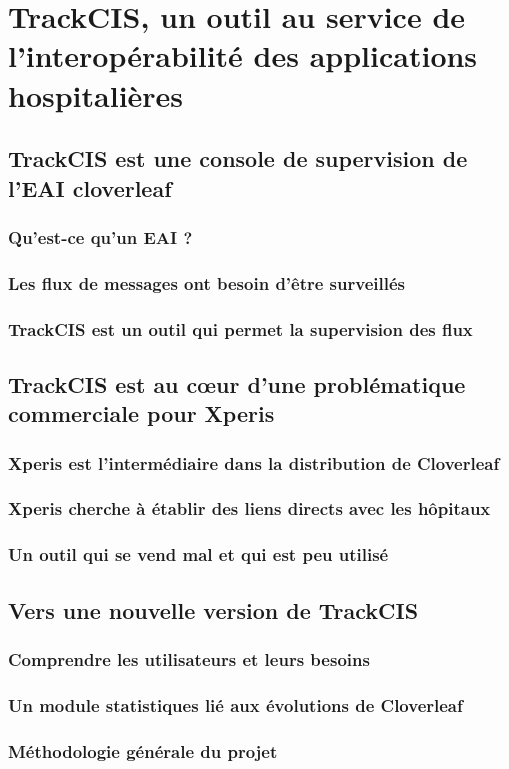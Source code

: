 \section{TrackCIS, un outil au service de l'interopérabilité des applications hospitalières}

\subsection{TrackCIS est une console de supervision de l'EAI cloverleaf}
\subsubsection{Qu'est-ce qu'un EAI ?}
\subsubsection{Les flux de messages ont besoin d'être surveillés}
\subsubsection{TrackCIS est un outil qui permet la supervision des flux}

\subsection{TrackCIS est au cœur d'une problématique commerciale pour Xperis}
\subsubsection{Xperis est l'intermédiaire dans la distribution de Cloverleaf}
\subsubsection{Xperis cherche à établir des liens directs avec les hôpitaux}
\subsubsection{Un outil qui se vend mal et qui est peu utilisé}

\subsection{Vers une nouvelle version de TrackCIS}
\subsubsection{Comprendre les utilisateurs et leurs besoins}
\subsubsection{Un module statistiques lié aux évolutions de Cloverleaf}
\subsubsection{Méthodologie générale du projet}